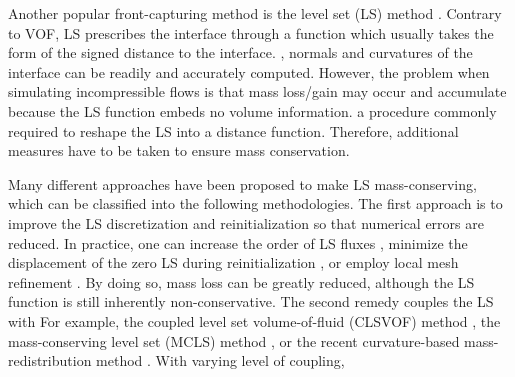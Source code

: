 Another popular front-capturing method is the level set (LS) method \cite{Sethian_levelset, Sussman_JCP_1994}. Contrary to VOF, LS prescribes the interface through a  function which usually takes the form of the signed distance to the interface. , normals and curvatures of the interface can be readily and accurately computed. However, the problem when simulating incompressible flows is that mass loss/gain may occur and accumulate because the LS function embeds no volume information.  a procedure commonly required to reshape the LS into a distance function. Therefore, additional measures have to be taken to ensure mass conservation.

Many different approaches have been proposed to make LS mass-conserving, which can be classified into the following  methodologies. The first approach is to improve the LS discretization and reinitialization so that numerical errors are reduced. In practice, one can increase the order of LS fluxes \cite{Nourgaliev_JCP_2007}, minimize the displacement of the zero LS during reinitialization , or employ local mesh refinement . By doing so, mass loss can be greatly reduced, although the LS function is still inherently non-conservative. The second remedy couples the LS with  For example,  the coupled level set volume-of-fluid (CLSVOF) method \cite{Sussman_JCP_2000}, the mass-conserving level set (MCLS) method \cite{Pijl_CVS_2008}, or the recent curvature-based mass-redistribution method \cite{Luo_JCP_2015}. With varying level of coupling, 

